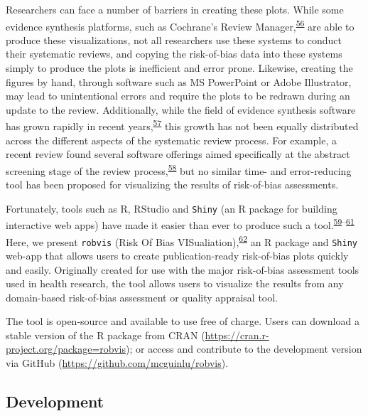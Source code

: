 \documentclass[a4paper, twoside]{templates/ociamthesis}
\begin{document}
Researchers can face a number of barriers in creating these plots. While some evidence synthesis platforms, such as Cochrane's Review Manager,\textsuperscript{\protect\hyperlink{ref-cochrane2014review}{56}} are able to produce these visualizations, not all researchers use these systems to conduct their systematic reviews, and copying the risk-of-bias data into these systems simply to produce the plots is inefficient and error prone. Likewise, creating the figures by hand, through software such as MS PowerPoint or Adobe Illustrator, may lead to unintentional errors and require the plots to be redrawn during an update to the review. Additionally, while the field of evidence synthesis software has grown rapidly in recent years,\textsuperscript{\protect\hyperlink{ref-marshall2015systematic}{57}} this growth has not been equally distributed across the different aspects of the systematic review process. For example, a recent review found several software offerings aimed specifically at the abstract screening stage of the review process,\textsuperscript{\protect\hyperlink{ref-harrison2020software}{58}} but no similar time- and error-reducing tool has been proposed for visualizing the results of risk-of-bias assessments.

Fortunately, tools such as R, RStudio and \texttt{Shiny} (an R package for building interactive web apps) have made it easier than ever to produce such a tool.\textsuperscript{\protect\hyperlink{ref-rref}{59}--\protect\hyperlink{ref-shinyref}{61}} Here, we present \texttt{robvis} (Risk Of Bias VISualiation),\textsuperscript{\protect\hyperlink{ref-mcguinness2019a}{62}} an R package and \texttt{Shiny} web-app that allows users to create publication-ready risk-of-bias plots quickly and easily. Originally created for use with the major risk-of-bias assessment tools used in health research, the tool allows users to visualize the results from any domain-based risk-of-bias assessment or quality appraisal tool.

The tool is open-source and available to use free of charge. Users can download a stable version of the R package from CRAN (\url{https://cran.r-project.org/package=robvis}); or access and contribute to the development version via GitHub (\url{https://github.com/mcguinlu/robvis}).

\hypertarget{development-1}{%
\subsection{Development}\label{development-1}}
\end{document}
